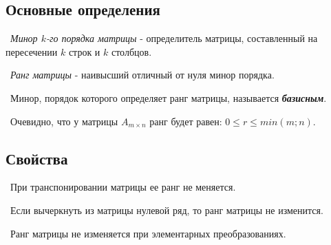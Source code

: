 \subsection*{Основные определения}

\noindent \textasteriskcentered~\textit{Минор $k$-го порядка матрицы} - определитель матрицы, составленный на пересечении $k$ строк и $k$ столбцов.

\smallskip
\noindent \textasteriskcentered~\textit{Ранг матрицы} - наивысший отличный от нуля минор порядка.

\smallskip
\noindent \textasteriskcentered~Минор, порядок которого определяет ранг матрицы, называется \textbf{\textit{базисным}}.

\medskip
\noindent \textbullet~Очевидно, что у матрицы $A_{m \times n}$ ранг будет равен: $0 \le r \le min(m;n)$.

\subsection*{Свойства}

\noindent \textbullet~При транспонировании матрицы ее ранг не меняется.

\smallskip
\noindent \textbullet~Если вычеркнуть из матрицы нулевой ряд, то ранг матрицы не изменится.

\smallskip
\noindent \textbullet~Ранг матрицы не изменяется при элементарных преобразованиях.
